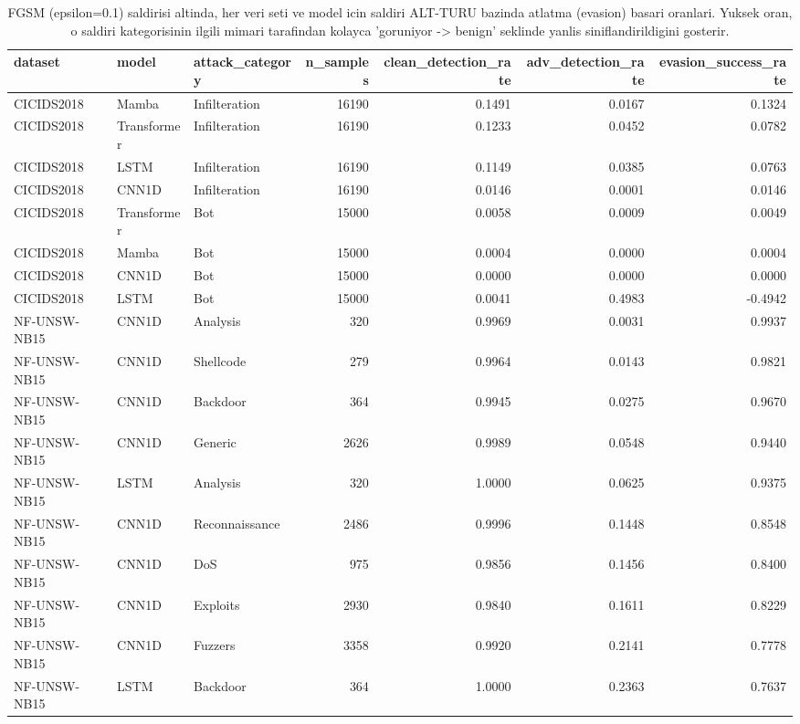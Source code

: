 \begin{table}[ht]
\centering
\caption{FGSM (epsilon=0.1) saldirisi altinda, her veri seti ve model icin saldiri ALT-TURU bazinda atlatma (evasion) basari oranlari. Yuksek oran, o saldiri kategorisinin ilgili mimari tarafindan kolayca 'goruniyor -> benign' seklinde yanlis siniflandirildigini gosterir.}
\label{tab:T3_saldiri_turu_kirilganligi}
\begin{tabular}{lllrrrr}
\toprule
dataset & model & attack\_category & n\_samples & clean\_detection\_rate & adv\_detection\_rate & evasion\_success\_rate \\
\midrule
CICIDS2018 & Mamba & Infilteration & 16190 & 0.1491 & 0.0167 & 0.1324 \\
CICIDS2018 & Transformer & Infilteration & 16190 & 0.1233 & 0.0452 & 0.0782 \\
CICIDS2018 & LSTM & Infilteration & 16190 & 0.1149 & 0.0385 & 0.0763 \\
CICIDS2018 & CNN1D & Infilteration & 16190 & 0.0146 & 0.0001 & 0.0146 \\
CICIDS2018 & Transformer & Bot & 15000 & 0.0058 & 0.0009 & 0.0049 \\
CICIDS2018 & Mamba & Bot & 15000 & 0.0004 & 0.0000 & 0.0004 \\
CICIDS2018 & CNN1D & Bot & 15000 & 0.0000 & 0.0000 & 0.0000 \\
CICIDS2018 & LSTM & Bot & 15000 & 0.0041 & 0.4983 & -0.4942 \\
NF-UNSW-NB15 & CNN1D & Analysis & 320 & 0.9969 & 0.0031 & 0.9937 \\
NF-UNSW-NB15 & CNN1D & Shellcode & 279 & 0.9964 & 0.0143 & 0.9821 \\
NF-UNSW-NB15 & CNN1D & Backdoor & 364 & 0.9945 & 0.0275 & 0.9670 \\
NF-UNSW-NB15 & CNN1D & Generic & 2626 & 0.9989 & 0.0548 & 0.9440 \\
NF-UNSW-NB15 & LSTM & Analysis & 320 & 1.0000 & 0.0625 & 0.9375 \\
NF-UNSW-NB15 & CNN1D & Reconnaissance & 2486 & 0.9996 & 0.1448 & 0.8548 \\
NF-UNSW-NB15 & CNN1D & DoS & 975 & 0.9856 & 0.1456 & 0.8400 \\
NF-UNSW-NB15 & CNN1D & Exploits & 2930 & 0.9840 & 0.1611 & 0.8229 \\
NF-UNSW-NB15 & CNN1D & Fuzzers & 3358 & 0.9920 & 0.2141 & 0.7778 \\
NF-UNSW-NB15 & LSTM & Backdoor & 364 & 1.0000 & 0.2363 & 0.7637 \\

\end{tabular}
\end{table}
